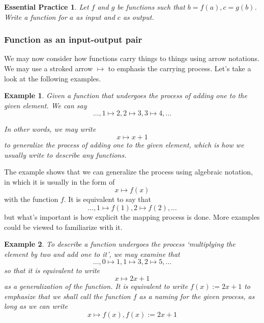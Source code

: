 \documentclass[12pt]{article}
\newtheorem*{example}{Example}
\newtheorem{exercise}{Essential Practice}[subsection]
\begin{document}
    \begin{exercise}
        Let $f$ and $g$ be functions such that $b=f(a), c=g(b)$. Write a function for $a$ as input and $c$ as output.
    \end{exercise}
        

    \subsubsection*{Function as an input-output pair}

    We may now consider how functions carry things to things using arrow notations. We may use a stroked arrow $\mapsto$ to emphasis the carrying process. Let's take a look at the following examples.

    \begin{example}
        Given a function that undergoes the process of adding one to the given element. We can say $$\dots, 1\mapsto 2, 2\mapsto 3, 3\mapsto 4, \dots$$

        In other words, we may write $$x\mapsto x+1$$ to generalize the process of adding one to the given element, which is how we usually write to describe any functions.
    \end{example}

    The example shows that we can generalize the process using algebraic notation, in which it is usually in the form of $$x\mapsto f(x)$$ with the function $f$. It is equivalent to say that $$\dots, 1\mapsto f(1), 2\mapsto f(2), \dots$$ but what's important is how explicit the mapping process is done. More examples could be viewed to familiarize with it.

    \begin{example}
        To describe a function undergoes the process `multiplying the element by two and add one to it', we may examine that $$\dots, 0\mapsto 1, 1\mapsto 3, 2\mapsto 5,\dots$$ so that it is equivalent to write $$x\mapsto 2x+1$$ as a generalization of the function. It is equivalent to write $f(x):=2x+1$ to emphasize that we shall call the function $f$ as a naming for the given process, as long as we can write $$x\mapsto f(x), f(x):=2x+1$$
    \end{example}
\end{document}
